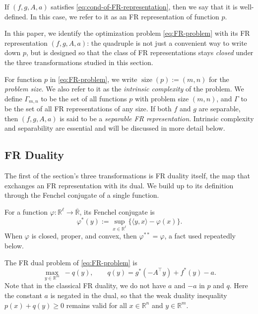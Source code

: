 \begin{definition}[FR representation]
    If \((f,g,A,a)\) satisfies \eqref{eq:cond-of-FR-representation}, then we say that it is well-defined. In this case, we refer to it as an FR representation of function \(p\).
\end{definition}

In this paper, we identify the optimization problem \eqref{eq:FR-problem} with its FR representation \((f,g,A,a)\): the quadruple is not just a convenient way to write down \(p\), but is designed so that the class of FR representations stays \emph{closed} under the three transformations studied in this section.

For function \(p\) in \eqref{eq:FR-problem}, we write \(\operatorname{size}(p):=(m,n)\) for the \emph{problem size}. We also refer to it as the \emph{intrinsic complexity} of the problem.
We define \(\Gamma_{m, n}\) to be the set of all functions \(p\) with problem size \((m, n)\), and \(\Gamma\) to be the set of all FR representations of any size.
If both \(f\) and \(g\) are separable, then \((f,g,A,a)\) is said to be a \emph{separable FR representation}. Intrinsic complexity and separability are essential and will be discussed in more detail below.






\subsection{FR Duality}


The first of the section's three transformations is FR duality itself,
the map that exchanges an FR representation with its dual. We build up
to its definition through the Fenchel conjugate of a single function.

For a function \(\varphi:\mathbb R^\ell\to\overline{\mathbb R}\), its Fenchel
conjugate is
\[
\varphi^*(y):=\sup_{x\in\mathbb R^\ell}\{\langle y,x\rangle-\varphi(x)\}.
\]
When \(\varphi\) is closed, proper, and convex, then
\(\varphi^{**}=\varphi\), a fact used repeatedly below. 

The FR dual problem of \eqref{eq:FR-problem} is
\[
\max_{y \in \mathbb R^m}\;
-q(y), \qquad q(y) = g^*(-A^\top y) + f^*(y)-a.
\]
Note that in the classical FR duality, we do not have \(a\) and \(-a\) in \(p\) and \(q\).
Here the constant \(a\) is negated in the dual, so that the weak duality inequality \(p(x) + q(y)\geq 0\) remains valid for all \(x\in \mathbb R^n\) and \(y \in \mathbb R^m\).

